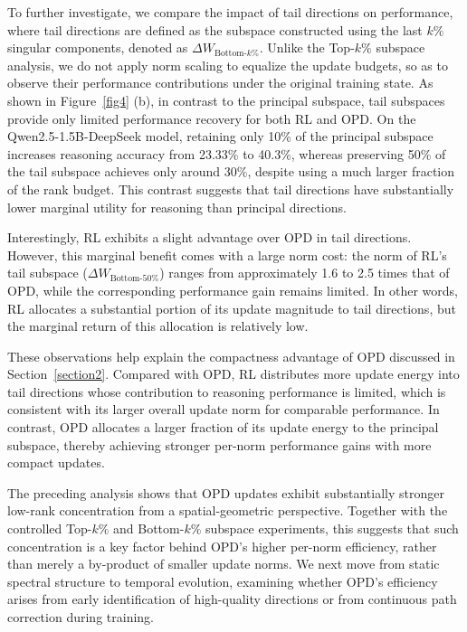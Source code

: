 \documentclass{article}
\begin{document}
To further investigate, we compare the impact of tail directions on performance, where tail directions are defined as the subspace constructed using the last $k\%$ singular components, denoted as $\Delta W_{\text{Bottom-}k\%}$. Unlike the Top-$k\%$ subspace analysis, we do not apply norm scaling to equalize the update budgets, so as to observe their performance contributions under the original training state. As shown in Figure~\ref{fig4} (b), in contrast to the principal subspace, tail subspaces provide only limited performance recovery for both RL and OPD. On the Qwen2.5-1.5B-DeepSeek model, retaining only 10\% of the principal subspace increases reasoning accuracy from 23.33\% to 40.3\%, whereas preserving 50\% of the tail subspace achieves only around 30\%, despite using a much larger fraction of the rank budget. This contrast suggests that tail directions have substantially lower marginal utility for reasoning than principal directions.

Interestingly, RL exhibits a slight advantage over OPD in tail directions. However, this marginal benefit comes with a large norm cost: the norm of RL's tail subspace ($\Delta W_{\text{Bottom-}50\%}$) ranges from approximately 1.6 to 2.5 times that of OPD, while the corresponding performance gain remains limited. In other words, RL allocates a substantial portion of its update magnitude to tail directions, but the marginal return of this allocation is relatively low.

These observations help explain the compactness advantage of OPD discussed in Section~\ref{section2}. Compared with OPD, RL distributes more update energy into tail directions whose contribution to reasoning performance is limited, which is consistent with its larger overall update norm for comparable performance. In contrast, OPD allocates a larger fraction of its update energy to the principal subspace, thereby achieving stronger per-norm performance gains with more compact updates.

The preceding analysis shows that OPD updates exhibit substantially stronger low-rank concentration from a spatial-geometric perspective. Together with the controlled Top-$k\%$ and Bottom-$k\%$ subspace experiments, this suggests that such concentration is a key factor behind OPD's higher per-norm efficiency, rather than merely a by-product of smaller update norms. We next move from static spectral structure to temporal evolution, examining whether OPD's efficiency arises from early identification of high-quality directions or from continuous path correction during training.
\end{document}
